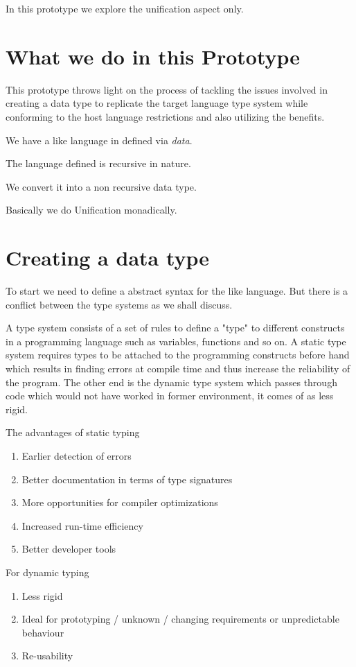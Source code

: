 \documentclass[thesis-solanki.tex]{subfiles}
\begin{document}
In this prototype we explore the unification aspect only.

\section{What we do in this Prototype}
This prototype throws light on the process of tackling the issues involved in creating 
a data type to replicate the target language type system while conforming to the host language restrictions and also utilizing the 
benefits. 


We have a  like language in  defined via \textit{data}.

The language defined is recursive in nature. 

We convert it into a non recursive data type.


Basically we do Unification monadically.


\section{Creating a data type}

To start we need to define a abstract syntax for the  like language. But there is a conflict between the type systems as 
we shall discuss.


A type system consists of a set of rules to define a "type" to different constructs in a programming language such as variables, functions 
and so on. A static type system requires types to be attached to the programming constructs before hand which results in finding errors at 
compile time and thus increase the reliability of the program. The other end is the dynamic type system which passes through code which 
would not have worked in former environment, it comes of as less rigid.

The advantages of static typing \cite{meijer2004static}
\begin{enumerate}
\item Earlier detection of errors
\item Better documentation in terms of type signatures
\item More opportunities for compiler optimizations
\item Increased run-time efficiency
\item Better developer tools 
\end{enumerate}          

For dynamic typing
\begin{enumerate}
\item Less rigid
\item Ideal for prototyping / unknown / changing requirements or unpredictable behaviour 
\item Re-usability  
\end{enumerate}
\end{document}
